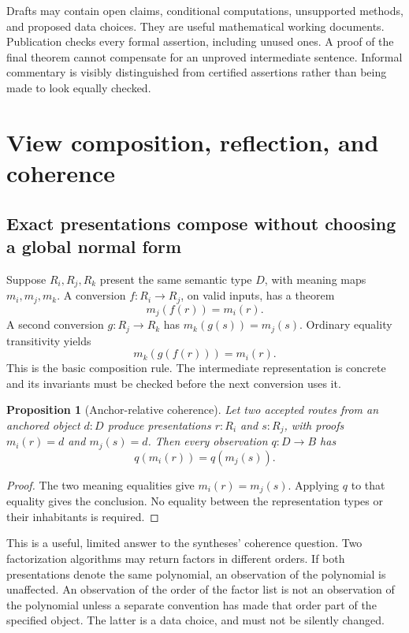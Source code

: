 \documentclass[11pt,a4paper]{article}
\newtheorem{proposition}{Proposition}[section]
\theoremstyle{definition}
\begin{document}
Drafts may contain open claims, conditional computations, unsupported methods,
and proposed data choices. They are useful mathematical working documents.
Publication checks every formal assertion, including unused ones. A proof of
the final theorem cannot compensate for an unproved intermediate sentence.
Informal commentary is visibly distinguished from certified assertions rather
than being made to look equally checked.

\section{View composition, reflection, and coherence}\label{sec:views}
\subsection{Exact presentations compose without choosing a global normal form}
Suppose \(R_i,R_j,R_k\) present the same semantic type \(D\), with meaning maps
\(m_i,m_j,m_k\). A conversion \(f:R_i\to R_j\), on valid inputs, has a theorem
\[
 m_j(f(r))=m_i(r).
\]
A second conversion \(g:R_j\to R_k\) has
\(m_k(g(s))=m_j(s)\). Ordinary equality transitivity yields
\[
 m_k(g(f(r)))=m_i(r).
\]
This is the basic composition rule. The intermediate representation is concrete
and its invariants must be checked before the next conversion uses it.

\begin{proposition}[Anchor-relative coherence]\label{prop:coherence}
Let two accepted routes from an anchored object \(d:D\) produce presentations
\(r:R_i\) and \(s:R_j\), with proofs \(m_i(r)=d\) and \(m_j(s)=d\). Then every
observation \(q:D\to B\) has
\[
 q(m_i(r))=q(m_j(s)).
\]
\end{proposition}
\begin{proof}
The two meaning equalities give \(m_i(r)=m_j(s)\). Applying \(q\) to that equality
gives the conclusion. No equality between the representation types or their
inhabitants is required.
\end{proof}

This is a useful, limited answer to the syntheses' coherence question. Two
factorization algorithms may return factors in different orders. If both
presentations denote the same polynomial, an observation of the polynomial is
unaffected. An observation of the order of the factor list is not an observation
of the polynomial unless a separate convention has made that order part of the
specified object. The latter is a data choice, and must not be silently changed.
\end{document}
